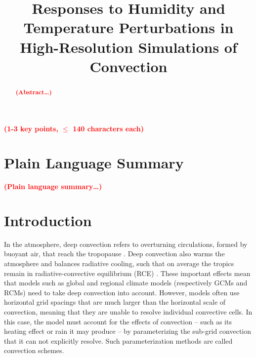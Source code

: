 \documentclass[draft]{agujournal2019}
\newcommand{\todo}[1]{\textcolor{red}{\textbf{(#1)}}}
\begin{document}
\title{Responses to Humidity and Temperature Perturbations in High-Resolution Simulations of Convection}




\begin{keypoints}
\item \todo{1-3 key points, $\leq$ 140 characters each}
\end{keypoints}

\justifying
\begin{abstract}
\todo{Abstract\ldots}
\end{abstract}

\section*{Plain Language Summary}
\todo{Plain language summary\ldots}

\section{Introduction}

In the atmosphere, deep convection refers to overturning circulations, formed by
buoyant air, that reach the tropopause \cite{Wallace_2006}. Deep convection also
warms the atmosphere and balances radiative cooling, such that on average the
tropics remain in radiative-convective equilibrium (RCE) \cite{Manabe_JAS_1964}.
These important effects mean that models such as global and regional climate
models (respectively GCMs and RCMs) need to take deep convection into account.
However, models often use horizontal grid spacings that are much larger than the
horizontal scale of convection, meaning that they are unable to resolve
individual convective cells. In this case, the model must account for the
effects of convection -- such as its heating effect or rain it may produce -- by
parameterizing the sub-grid convection that it can not explicitly resolve. Such
parameterization methods are called convection schemes. 
\end{document}
